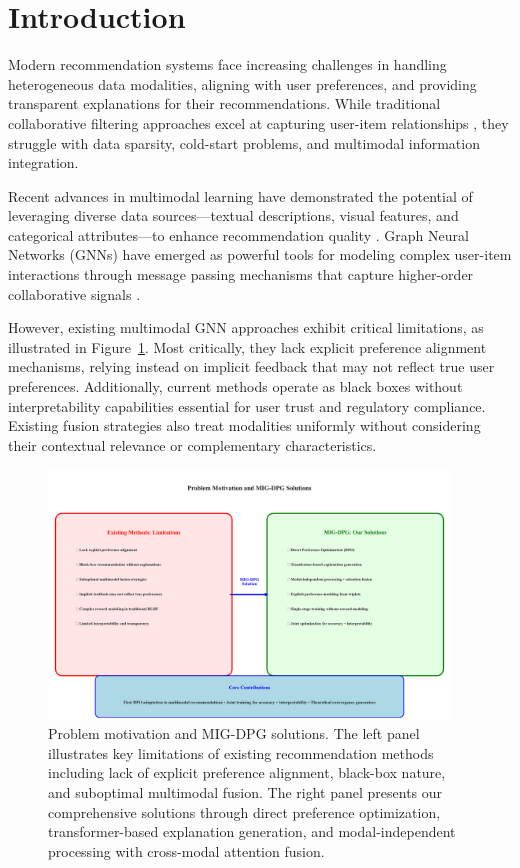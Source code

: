 \documentclass[pdflatex,sn-mathphys-num]{sn-jnl}%
\theoremstyle{thmstyleone}%
\theoremstyle{thmstyletwo}%
\theoremstyle{thmstylethree}%
\begin{document}
\section{Introduction}\label{sec:intro}

Modern recommendation systems face increasing challenges in handling heterogeneous data modalities, aligning with user preferences, and providing transparent explanations for their recommendations. While traditional collaborative filtering approaches excel at capturing user-item relationships \cite{koren2009matrix}, they struggle with data sparsity, cold-start problems, and multimodal information integration.

Recent advances in multimodal learning have demonstrated the potential of leveraging diverse data sources—textual descriptions, visual features, and categorical attributes—to enhance recommendation quality \cite{wei2019mmgcn,chen2017attentive}. Graph Neural Networks (GNNs) have emerged as powerful tools for modeling complex user-item interactions through message passing mechanisms that capture higher-order collaborative signals \cite{he2020lightgcn,wang2019neural}.

However, existing multimodal GNN approaches exhibit critical limitations, as illustrated in Figure~\ref{fig:problem_solution}. Most critically, they lack explicit preference alignment mechanisms, relying instead on implicit feedback that may not reflect true user preferences. Additionally, current methods operate as black boxes without interpretability capabilities essential for user trust and regulatory compliance. Existing fusion strategies also treat modalities uniformly without considering their contextual relevance or complementary characteristics.

\begin{figure}[H]
\centering
\includegraphics[width=0.95\textwidth]{figures/problem_solution_new.pdf}
\caption{Problem motivation and MIG-DPG solutions. The left panel illustrates key limitations of existing recommendation methods including lack of explicit preference alignment, black-box nature, and suboptimal multimodal fusion. The right panel presents our comprehensive solutions through direct preference optimization, transformer-based explanation generation, and modal-independent processing with cross-modal attention fusion.}
\label{fig:problem_solution}
\end{figure}
\end{document}
